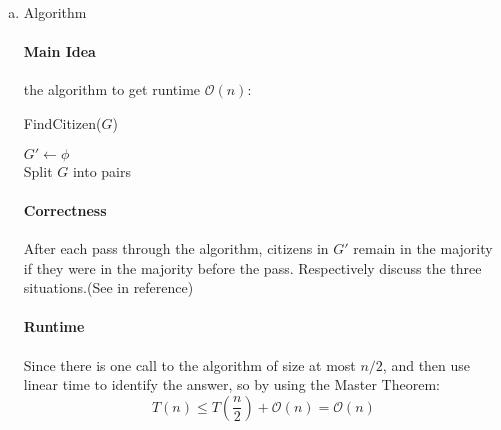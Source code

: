 \documentclass[11pt]{article}
\newenvironment{qparts}{\begin{enumerate}[(a)]}{\end{enumerate}}
\begin{document}
\begin{qparts}
		\item Algorithm 
		\paragraph{Main Idea} the algorithm to get runtime $\mathcal{O}(n)$:\\
		\begin{algorithm}[H]
			\caption{FindCitizen($G$) }
			$G' \leftarrow \phi$\\
			Split $G$ into pairs\\
		\end{algorithm}
		
		\paragraph{Correctness} After each pass through the algorithm, citizens in $G'$ remain in the majority if they were in the majority before the pass. Respectively discuss the three situations.(See in reference)
		
		\paragraph{Runtime} Since there is one call to the algorithm of size at most $n/2$, and then use linear time to identify the answer, so by using the Master Theorem:
		$$T(n) \leq T(\frac{n}{2}) + \mathcal{O}(n) = \mathcal{O}(n)$$
	\end{qparts}
	
	\vspace{0.7cm}
	
\end{document}
